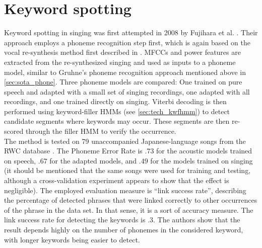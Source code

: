 \section{Keyword spotting}
Keyword spotting in singing was first attempted in 2008 by Fujihara et al. \cite{hyperlinking_lyrics}. Their approach employs a phoneme recognition step first, which is again based on the vocal re-synthesis method first described in \cite{fujihara_identification}. MFCCs and power features are extracted from the re-synthesized singing and used as inputs to a phoneme model, similar to Gruhne's phoneme recognition approach mentioned above in \ref{sec:sota_phone}.  Three phoneme models are compared: One trained on pure speech and adapted with a small set of singing recordings, one adapted with all recordings, and one trained directly on singing. Viterbi decoding is then performed using keyword-filler HMMs (see \ref{sec:tech_kwfhmm}) to detect candidate segments where keywords may occur. These segments are then re-scored through the filler HMM to verify the occurrence.\\
The method is tested on 79 unaccompanied Japanese-language songs from the RWC database \cite{rwc}. The Phoneme Error Rate is $.73$ for the acoustic models trained on speech, $.67$ for the adapted models, and $.49$ for the models trained on singing (it should be mentioned that the same songs were used for training and testing, although a cross-validation experiment appears to show that the effect is negligible). The employed evaluation measure is ``link success rate'', describing the percentage of detected phrases that were linked correctly to other occurrences of the phrase in the data set. In that sense, it is a sort of accuracy measure. The link success rate for detecting the keywords is $.3$. The authors show that the result depends highly on the number of phonemes in the considered keyword, with longer keywords being easier to detect.\\

